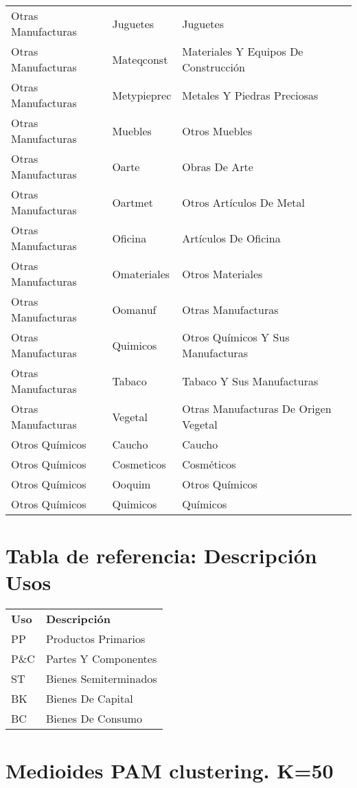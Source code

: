 \documentclass[class=article, crop=false]{standalone}
\begin{document}
\begin{longtable}[!ht]{lll}
	Otras Manufacturas & Juguetes & Juguetes \\
	Otras Manufacturas & Mateqconst & Materiales Y Equipos De Construcción \\
	Otras Manufacturas & Metypieprec & Metales Y Piedras Preciosas \\
	Otras Manufacturas & Muebles & Otros Muebles \\
	Otras Manufacturas & Oarte & Obras De Arte \\
	Otras Manufacturas & Oartmet & Otros Artículos De Metal \\
	Otras Manufacturas & Oficina & Artículos De Oficina \\
	Otras Manufacturas & Omateriales & Otros Materiales \\
	Otras Manufacturas & Oomanuf & Otras Manufacturas \\
	Otras Manufacturas & Quimicos & Otros Químicos Y Sus Manufacturas \\
	Otras Manufacturas & Tabaco & Tabaco Y Sus Manufacturas \\
	Otras Manufacturas & Vegetal & Otras Manufacturas De Origen Vegetal \\
	Otros Químicos & Caucho & Caucho \\
	Otros Químicos & Cosmeticos & Cosméticos \\
	Otros Químicos & Ooquim & Otros Químicos \\
	Otros Químicos & Quimicos & Químicos
\label{tabla:subcadenas}
\end{longtable}



\section{Tabla de referencia: Descripción Usos}


\begin{table}[!ht]
	\begin{tabular}{ll}
		\textbf{Uso} & \textbf{Descripción} \\
		PP & Productos Primarios \\
		P\&C & Partes Y Componentes \\
		ST & Bienes Semiterminados \\
		BK & Bienes De Capital \\
		BC & Bienes De Consumo
	\end{tabular}
\end{table}


\section{Medioides PAM clustering. K=50}
\end{document}
